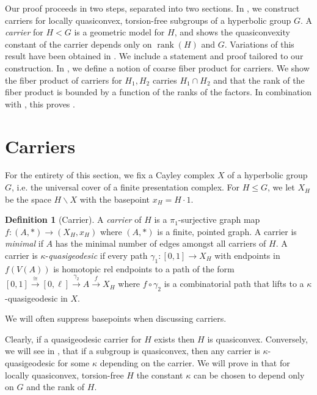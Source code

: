 \documentclass[article, 12pt]{amsart}
\numberwithin{equation}{section}
\theoremstyle{definition}
\newtheorem{definition}[theorem]{Definition}
\DeclareMathOperator{\rank}{rank}
\begin{document}
Our proof proceeds in two steps, separated into two sections. 
In , we construct carriers for locally quasiconvex, torsion-free subgroups of a hyperbolic group $G$.
A \emph{carrier} for $H<G$ is a geometric model for $H$, and  shows the quasiconvexity constant of the carrier depends only on $\rank(H)$ and $G$.
Variations of this result have been obtained in \cite{kapovich2004freely,biringer2025thick,kohav2024ascendingchainsfreequasiconvex}.
We include a statement and proof tailored to our construction.
In , we define a notion of coarse fiber product for carriers. 
We show the fiber product of carriers for $H_1,H_2$ carries $H_1\cap H_2$ and that the rank of the fiber product is bounded by a function of the ranks of the factors.
In combination with , this proves .



\section{Carriers}\label{sec:carrier section}

For the entirety of this section, we fix a Cayley complex $X$ of a hyperbolic group $G$, i.e. the universal cover of a finite presentation complex.
For $H\le G$, we let $X_H$ be the space $H\backslash X$ with the basepoint $x_H=H\cdot 1$.


\begin{definition}[Carrier]
    A \emph{carrier} of $H$ is a $\pi_1$-surjective graph map $f:(A,*)\to (X_H,x_H)$ where $(A,*)$ is a finite, pointed graph.
    A carrier is \emph{minimal} if $A$ has the minimal number of edges amongst all carriers of $H$.
    A carrier is $\kappa$-\emph{quasigeodesic} if every path $\gamma_1:[0,1]\to X_H$ with endpoints in $f(V(A))$ is homotopic rel endpoints to a path of the form $[0,1]\xrightarrow[]{\cong} [0,\ell]\xrightarrow[]{\gamma_2} A\xrightarrow[]{f} X_H$ where $f\circ \gamma_2$ is a combinatorial path that lifts to a $\kappa$-quasigeodesic in $X$.
\end{definition}

We will often suppress basepoints when discussing carriers.
\smallskip

Clearly, if a quasigeodesic carrier for $H$ exists then $H$ is quasiconvex.
Conversely, we will see in , that if a subgroup is quasiconvex, then any carrier is $\kappa$-quasigeodesic for some $\kappa$ depending on the carrier.
We will prove in  that for locally quasiconvex, torsion-free $H$ the constant $\kappa$ can be chosen to depend only on $G$ and the rank of $H$. 
\end{document}
